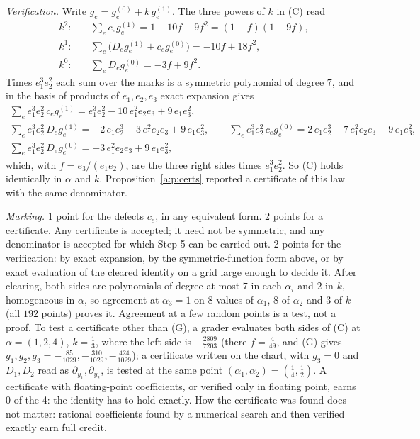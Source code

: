 \documentclass[11pt]{article}
\theoremstyle{plain}
\theoremstyle{definition}
\theoremstyle{remark}
\begin{document}
\emph{Verification.} Write $g_e=g^{(0)}_e+k\,g^{(1)}_e$. The three powers of $k$ in (C) read
\begin{align*}
k^2:&\quad \textstyle\sum_ec_eg^{(1)}_e=1-10f+9f^2=(1-f)(1-9f),\\
k^1:&\quad \textstyle\sum_e\big(D_eg^{(1)}_e+c_eg^{(0)}_e\big)=-10f+18f^2,\\
k^0:&\quad \textstyle\sum_eD_eg^{(0)}_e=-3f+9f^2 .
\end{align*}
Times $e_1^3e_2^2$ each sum over the marks is a symmetric polynomial of degree $7$, and in the basis of products of $e_1,e_2,e_3$ exact expansion gives
\begin{gather*}
\textstyle\sum_ee_1^3e_2^2\,c_eg^{(1)}_e=e_1^3e_2^2-10\,e_1^2e_2e_3+9\,e_1e_3^2,\\
\textstyle\sum_ee_1^3e_2^2\,D_eg^{(1)}_e=-2\,e_1e_2^3-3\,e_1^2e_2e_3+9\,e_1e_3^2,\qquad
\sum_ee_1^3e_2^2\,c_eg^{(0)}_e=2\,e_1e_2^3-7\,e_1^2e_2e_3+9\,e_1e_3^2,\\
\textstyle\sum_ee_1^3e_2^2\,D_eg^{(0)}_e=-3\,e_1^2e_2e_3+9\,e_1e_3^2,
\end{gather*}
which, with $f=e_3/(e_1e_2)$, are the three right sides times $e_1^3e_2^2$. So (C) holds identically in $\alpha$ and $k$. Proposition~\ref{a:p:certs} reported a certificate of this law with the same denominator.

\smallskip\noindent\emph{Marking.} 1 point for the defects $c_e$, in any equivalent form. 2 points for a certificate. Any certificate is accepted; it need not be symmetric, and any denominator is accepted for which Step 5 can be carried out. 2 points for the verification: by exact expansion, by the symmetric-function form above, or by exact evaluation of the cleared identity on a grid large enough to decide it. After clearing, both sides are polynomials of degree at most $7$ in each $\alpha_i$ and $2$ in $k$, homogeneous in $\alpha$, so agreement at $\alpha_3=1$ on $8$ values of $\alpha_1$, $8$ of $\alpha_2$ and $3$ of $k$ (all $192$ points) proves it. Agreement at a few random points is a test, not a proof. To test a certificate other than (G), a grader evaluates both sides of (C) at $\alpha=(1,2,4)$, $k=\frac13$, where the left side is $-\frac{2809}{7203}$ (there $f=\frac4{49}$, and (G) gives $g_1,g_2,g_3=-\frac{85}{1029},-\frac{310}{1029},-\frac{424}{1029}$); a certificate written on the chart, with $g_3=0$ and $D_1,D_2$ read as $\partial_{y_1},\partial_{y_2}$, is tested at the same point $(\alpha_1,\alpha_2)=(\frac14,\frac12)$. A certificate with floating-point coefficients, or verified only in floating point, earns 0 of the 4: the identity has to hold exactly. How the certificate was found does not matter: rational coefficients found by a numerical search and then verified exactly earn full credit.
\end{document}
